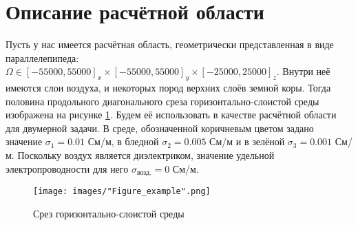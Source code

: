 \section{Описание расчётной области}

Пусть у нас имеется расчётная область, геометрически представленная в виде параллелепипеда: $\Omega \in [-55000, 55000]_x \times [-55000, 55000]_y \times [-25000, 25000]_z$. Внутри неё имеются слои воздуха, и некоторых пород верхних слоёв земной коры. Тогда половина продольного диагонального среза горизонтально-слоистой среды изображена на рисунке \ref{fig:example}. Будем её использовать в качестве расчётной области для двумерной задачи. В среде, обозначенной коричневым цветом задано значение $\sigma_1 = 0.01$ См/м, в бледной $\sigma_2 = 0.005$ См/м и в зелёной $\sigma_3 = 0.001$ См/м. Поскольку воздух является диэлектриком, значение удельной электропроводности для него $\sigma_{\text{возд.}} = 0$ См/м.

\begin{figure}
	\centering
	\vspace*{0.7cm}
	\texttt{[image: images/"Figure\_example".png]}
	\caption{Срез горизонтально-слоистой среды}
	\label{fig:example}
\end{figure}